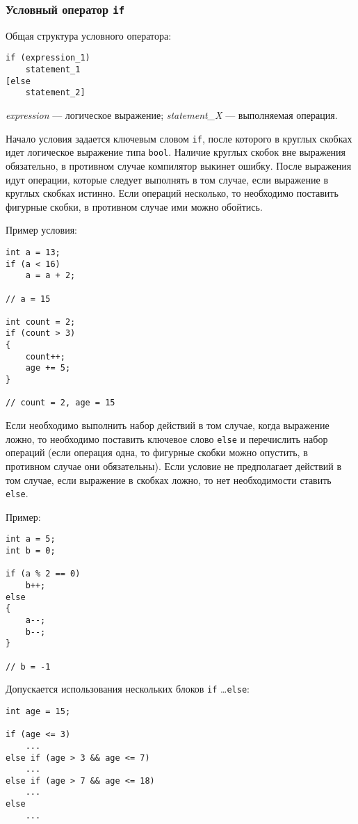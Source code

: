 \subsubsection{Условный оператор \texttt{if}}
Общая структура условного оператора:
\begin{lstlisting}
if (expression_1)
    statement_1
[else
    statement_2]
\end{lstlisting}

\textit{expression} --- логическое выражение; \textit{statement\_X} --- выполняемая операция.

Начало условия задается ключевым словом \lstinline|if|, после которого в круглых скобках идет логическое выражение типа \lstinline|bool|. Наличие круглых скобок вне выражения обязательно, в противном случае компилятор выкинет ошибку. После выражения идут операции, которые следует выполнять в том случае, если выражение в круглых скобках истинно. Если операций несколько, то необходимо поставить фигурные скобки, в противном случае ими можно обойтись.

Пример условия:

\begin{lstlisting}
int a = 13;
if (a < 16)
    a = a + 2;

// a = 15

int count = 2;
if (count > 3)
{
    count++;
    age += 5;
}

// count = 2, age = 15
\end{lstlisting}

Если необходимо выполнить набор действий в том случае, когда выражение ложно, то необходимо поставить ключевое слово \lstinline|else| и перечислить набор операций (если операция одна, то фигурные скобки можно опустить, в противном случае они обязательны). Если условие не предполагает действий в том случае, если выражение в скобках ложно, то нет необходимости ставить \lstinline|else|.

Пример:
\begin{lstlisting}
int a = 5;
int b = 0;

if (a % 2 == 0)
    b++;
else
{
    a--;
    b--;
}

// b = -1
\end{lstlisting}

Допускается использования нескольких блоков \lstinline|if| \ldots \lstinline|else|:

\begin{lstlisting}
int age = 15;

if (age <= 3)
    ...
else if (age > 3 && age <= 7)
    ...
else if (age > 7 && age <= 18)
    ...
else
    ...
\end{lstlisting}

